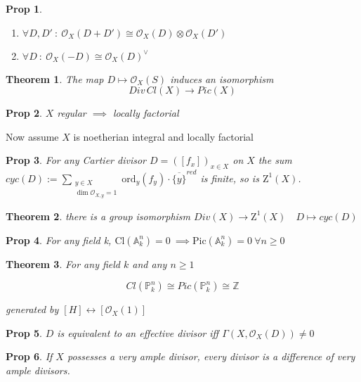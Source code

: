\documentclass[a4paper, 12pt]{article}
\newcommand{\ca}[1]{\mathcal{#1}}
\newcommand{\ox}{\mathcal{O}_X}
\newtheorem*{prop}{Prop}
\newtheorem*{thm}{Theorem}
\begin{document}
	\begin{prop}
		\begin{enumerate}
			\item $ \forall D,D' \: : \: \ox(D+D') \cong  \ox(D) \otimes\ox(D') $
			\item $ \forall D \: :\: \ox(-D) \cong \ox(D)^{\vee}  $
		\end{enumerate}
	\end{prop}
	
	\begin{thm}
		The map $ D \longmapsto \ox(S) $ induces an isomorphism
		\[ Div\, Cl (X) \longrightarrow Pic (X) \]
	\end{thm}
	
	\begin{prop}
		$ X $ regular $ \implies $ locally factorial
	\end{prop}
	
	
	Now assume $ X $ is noetherian integral and locally factorial
	
	\begin{prop}
		For any Cartier divisor $ D = ([f_x])_{x\in X} $ on $ X $ the sum $ cyc(D) :=  \underset{\substack{y \in X \\ \dim \ca{O}_{X,y} = 1 }}{\sum} \mathrm{ord}_y (f_y)\cdot \overline{ \{ y \} }^{red} $ is finite, so is $ \mathrm{Z}^1(X) $.
	\end{prop}
	
	\begin{thm}
		there is a group isomorphism
		$ Div(X) \rightarrow \mathrm{Z}^1(X) \quad D \mapsto cyc(D) $
	\end{thm}
	
	\begin{prop}
		For any field k, $ \mathrm{Cl}(\mathbb{A}^n_k) = 0 \: \implies \mathrm{Pic}(\mathbb{A}^n_k) = 0 \: \forall n \geq 0 $
	\end{prop}
	
	\begin{thm}
		For any field $ k $ and any $  n \geq 1 $
		
		\[ Cl(\mathbb{P}^n_k) \cong Pic(\mathbb{P}^n_k) \cong \mathbb{Z} \]
		
		generated by $ [H] \longleftrightarrow [\ox(1)] $
	\end{thm}
	
	\begin{prop}
		$ D $ is equivalent to an effective divisor iff $ \Gamma(X, \ox(D)) \neq 0 $
	\end{prop}
	
	\begin{prop}
		If $ X $ possesses a very ample divisor, every divisor is a difference of very ample divisors. 
	\end{prop}
	
\end{document}
